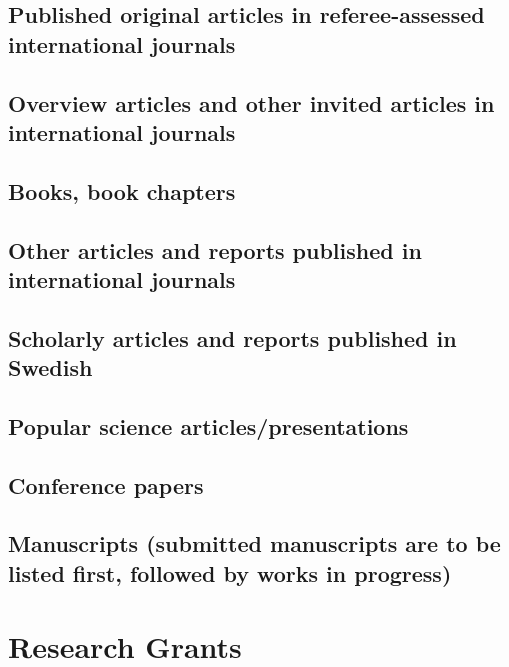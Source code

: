 \subsection{Published original articles in referee-assessed international journals}\label{ssec:published-original-articles-in-referee-assessed-international-journals}
\subsection{Overview articles and other invited articles in international journals \noneyet}\label{ssec:overview-articles-and-other-invited-articles-in-international-journals-noneyet}
\subsection{Books, book chapters}\label{ssec:books-book-chapters}
\subsection{Other articles and reports published in international journals \noneyet}\label{ssec:other-articles-and-reports-published-in-international-journals-noneyet}

\subsection{Scholarly articles and reports published in Swedish \noneyet}\label{ssec:scholarly-articles-and-reports-published-in-swedish-noneyet}

\subsection{Popular science articles/presentations}\label{ssec:popular-science-articles-presentations}

\subsection{Conference papers}\label{ssec:conference-papers}

\subsection{Manuscripts (submitted manuscripts are to be listed first, followed by works in progress)}\label{ssec:manuscripts-submitted-manuscripts-are-to-be-listed-first-followed-by-works-in-progress}

\section{Research Grants} \label{sec:research-grants}

